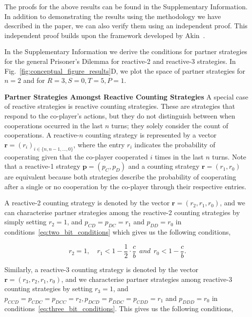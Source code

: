 \documentclass{article}
\theoremstyle{definition}
\begin{document}
The proofs for the above results can be found in the Supplementary Information.
In addition to demonstrating the results using the methodology we have described
in the paper, we can also verify them using an independent proof. This
independent proof builds upon the framework developed by
Akin~\cite{akin:EGADS:2016}.

In the Supplementary Information we derive the conditions for partner strategies
for the general Prisoner's Dilemma for reactive-2 and reactive-3 strategies. In
Fig.~\ref{fig:conceptual_figure_results}D, we plot the space of partner
strategies for $n=2$ and for $R =3, S=0, T=5, P=1$.

\textbf{Partner Strategies Amongst Reactive Counting Strategies}
A special case of reactive strategies is reactive counting strategies. These are
strategies that respond to the co-player's actions, but they do not distinguish
between when cooperations occurred in the last $n$ turns; they solely consider
the count of cooperations. A reactive-$n$ counting strategy is represented by a
vector $\mathbf{r}=(r_i)_{i \in \{n, n -1, \dots, 0\}}$, where the entry \(r_i\)
indicates the probability of cooperating given that the co-player cooperated
\(i\) times in the last \(n\) turns. Note that a reactive-1 strategy
$\mathbf{p}=(p_{C}, p_{D})$ and a counting strategy $\mathbf{r}=(r_1, r_0)$ are
equivalent because both strategies describe the probability of cooperating after
a single or no cooperation by the co-player through their respective entries. 

A reactive-2 counting strategy is denoted by the vector $\mathbf{r}=(r_2,
r_1, r_0)$, and we can characterise partner strategies among the reactive-2
counting strategies by simply setting $r_2 = 1$, and $p_{CD} = p_{DC} = r_1$ and
$p_{DD} = r_0$ in conditions~\eqref{eq:two_bit_conditions} which gives us the
following conditions,

\begin{equation}\label{eq:counting_two_bit_conditions}
  r_2 = 1, \quad \displaystyle r_1 < 1-\frac{1}{2} \cdot \frac{c}{b} ~~and~~ r_0 < 1\!-\! \frac{c}{b}.
\end{equation}

Similarly, a reactive-3 counting strategy is denoted by the vector
$\mathbf{r}=(r_3, r_2, r_1, r_0)$, and we characterise partner strategies among
reactive-3 counting strategies by setting $r_3 = 1$, and $p_{CCD} = p_{CDC} =
p_{DCC} = r_2, p_{DCD} = p_{DDC} = p_{CDD} = r_1$ and $p_{DDD} = r_0$ in
conditions~\eqref{eq:three_bit_conditions}. This gives us the following
conditions,
\end{document}
